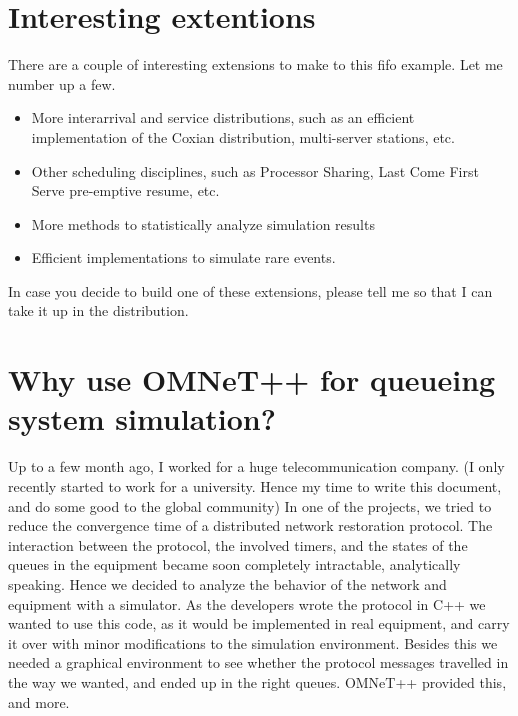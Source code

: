 \documentclass[a4paper]{article}
\begin{document}
\section{Interesting extentions}
\label{sec:inter-extent}
There are a couple of interesting extensions to make to this fifo
example. Let me number up a few.
\begin{itemize}
\item More interarrival and service distributions, such as an efficient
  implementation of the Coxian distribution, multi-server stations, etc.
\item Other scheduling disciplines, such as Processor Sharing, Last Come First
Serve pre-emptive resume, etc.
\item More methods to statistically analyze simulation results
\item Efficient implementations to simulate rare events. 
\end{itemize}
In case you decide to build one of these extensions, please tell me so
that I can take it up in the distribution.

\section{Why use OMNeT++ for queueing system simulation?}
\label{sec:why-use-omnet++}
Up to a few month ago, I worked for a huge telecommunication
company. (I only recently started to work for a university. Hence my
time to write this document, and do some good to the global community)  In
one of the projects, we tried to reduce the convergence
time of a distributed network restoration protocol. The interaction
between the protocol, the involved timers, and the states of the
queues in the equipment became soon completely intractable,
analytically speaking.  Hence we decided to analyze the behavior of
the  network and equipment with a  simulator. As the developers wrote the
protocol  in C++ we wanted to use this  code, as it would be
implemented in real  equipment, and carry it over with minor modifications
 to the simulation environment. Besides this we needed a graphical
environment to see whether the protocol messages travelled in the way
we wanted, and ended up in the right queues. OMNeT++ provided this,
and more. 
\end{document}
